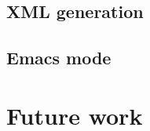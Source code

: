 \subsection{XML generation}\label{sec:xml}


\subsection{Emacs mode}\label{sec:emacs}


\section{Future work}


%
%
%
